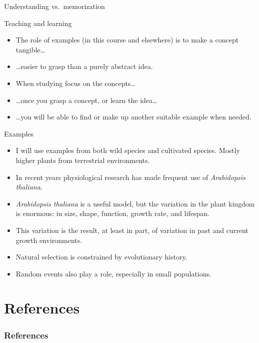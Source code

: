 \documentclass[10pt]{beamer}
\begin{document}
\begin{frame}{Understanding vs.\ memorization}

  \begin{alertblock}{Teaching and learning}
    \begin{itemize}
      \item The role of examples (in this course and elsewhere) is to make a concept tangible\ldots
      \item \ldots easier to grasp than a purely abstract idea.
      \item When studying focus on the concepts\ldots
      \item \ldots once you grasp a concept, or learn the idea\ldots
      \item \ldots you will be able to find or make up another suitable example when needed.
    \end{itemize}
  \end{alertblock}

\end{frame}

\begin{frame}{Examples}

\begin{itemize}
  \item I will use examples from both wild species and cultivated species. Mostly higher plants from terrestrial environments.
  \item In recent years physiological research has made frequent use of \emph{Arabidopsis thaliana}.
  \item \emph{Arabidopsis thaliana} is a useful model, but the variation in the plant kingdom is enormous: in size, shape, function, growth rate, and lifespan.
  \item This variation is the result, at least in part, of variation in past and current growth environments.
  \item Natural selection is constrained by evolutionary history.
  \item Random events also play a role, especially in small populations.
\end{itemize}

\end{frame}

\nocite{Chamovitz2017,Denison2012,Karban2015,Keddy2017,Manetas2012}
\nocite{Sadras2021,Sadras2014a}
\section*{References}

  \begin{frame}[t,allowframebreaks]
    \frametitle{References}
    \printbibliography
  \end{frame}
\end{document}
